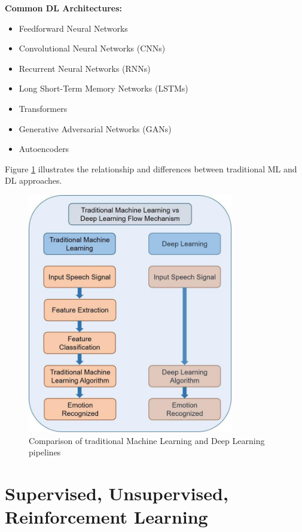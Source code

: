 \documentclass[11pt,a4paper]{report}
\begin{document}
\textbf{Common DL Architectures:}
\begin{itemize}
    \item Feedforward Neural Networks
    \item Convolutional Neural Networks (CNNs)
    \item Recurrent Neural Networks (RNNs)
    \item Long Short-Term Memory Networks (LSTMs)
    \item Transformers
    \item Generative Adversarial Networks (GANs)
    \item Autoencoders
\end{itemize}

Figure \ref{fig:ml-dl-comparison} illustrates the relationship and differences between traditional ML and DL approaches.

\begin{figure}[ht]
    \centering
    \includegraphics[width=0.8\textwidth]{ml_vs_dl_comparison.png}
    \caption{Comparison of traditional Machine Learning and Deep Learning pipelines}
    \label{fig:ml-dl-comparison}
\end{figure}

\section{Supervised, Unsupervised, Reinforcement Learning}
\end{document}
